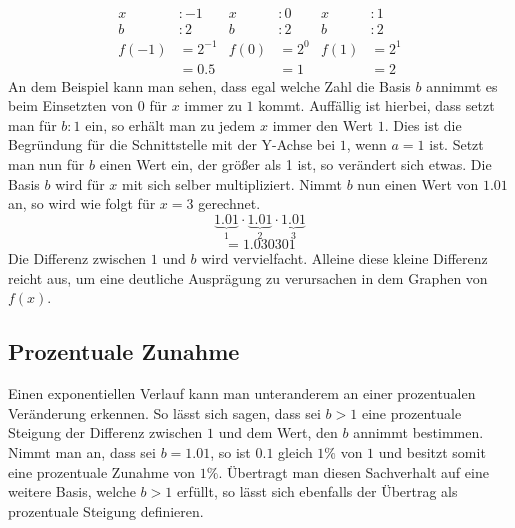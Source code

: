 \begin{align*}
x&:-1           &  x &: 0              &  x &:1\\
b&:2			& b&:2					& b&:2\\
f(-1)&=2^{-1}	& f(0)&=2^0	& f(1)&=2^1\\  
&=0.5  & &=1 & &=2
\end{align*}
An dem Beispiel kann man sehen, dass egal welche Zahl die Basis $b$ annimmt es beim Einsetzten von
$0$ für $x$ immer zu $1$ kommt. Auffällig ist hierbei, dass setzt man für $b : 1$ ein, so erhält man zu jedem $x$ immer den Wert $1$. Dies ist die Begründung für die Schnittstelle mit der Y-Achse bei $1$, wenn $a=1$ ist. Setzt man nun für $b$ einen Wert ein, der größer als 1 ist, so verändert sich etwas. Die Basis $b$ wird für $x$ mit sich selber multipliziert. Nimmt $b$ nun einen Wert von $1.01$ an, so wird wie folgt für $x=3$ gerechnet. 
	\[\underbrace{1.01}_{1}\cdot\underbrace{1.01}_{2}\cdot\underbrace{1.01}_{3}\]
	\[=1.030301\]
	Die Differenz zwischen $1$ und $b$ wird vervielfacht. Alleine diese kleine Differenz reicht aus, um eine deutliche Ausprägung zu verursachen in dem Graphen von $f(x)$.
	
	
 

 

 
 \subsection{Prozentuale Zunahme}
 Einen exponentiellen Verlauf kann man unteranderem an einer prozentualen Veränderung erkennen. So lässt sich sagen, dass sei $b>1$ eine prozentuale Steigung der Differenz zwischen
 $1$ und dem Wert, den $b$ annimmt bestimmen. \\
 Nimmt man an, dass sei $b=1.01$, so ist $0.1$ gleich $1\%$ von $1$ und besitzt somit eine prozentuale Zunahme von $1\%$. Übertragt man diesen Sachverhalt auf eine weitere Basis,
 welche $b>1$ erfüllt, so lässt sich ebenfalls der Übertrag als prozentuale Steigung definieren.
